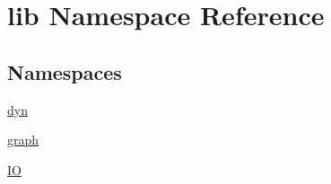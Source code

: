 \hypertarget{a00108}{\section{lib Namespace Reference}
\label{a00108}
}
\subsection*{Namespaces}
\begin{DoxyCompactItemize}
\item 
\hyperlink{a00109}{dyn}
\item 
\hyperlink{a00111}{graph}
\item 
\hyperlink{a00114}{I\-O}
\end{DoxyCompactItemize}

